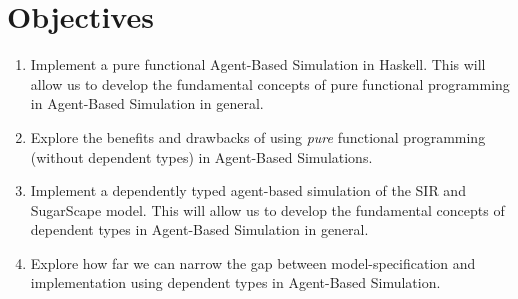 \section{Objectives}
\begin{enumerate}

	\item Implement a pure functional Agent-Based Simulation in Haskell. This will allow us to develop the fundamental concepts of pure functional programming in Agent-Based Simulation in general.

	\item Explore the benefits and drawbacks of using \textit{pure} functional programming (without dependent types) in Agent-Based Simulations.

	\item Implement a dependently typed agent-based simulation of the SIR and SugarScape model. This will allow us to develop the fundamental concepts of dependent types in Agent-Based Simulation in general.



	\item Explore how far we can narrow the gap between model-specification and implementation using dependent types in Agent-Based Simulation. %
\end{enumerate}